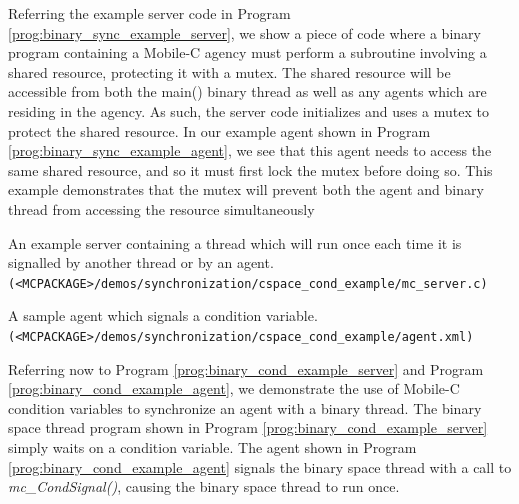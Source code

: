 \documentclass[11pt]{report}
\begin{document}
Referring the example server code in Program
\vref{prog:binary_sync_example_server}, we show a piece of code where
a binary program containing a Mobile-C agency must perform a
subroutine involving a shared resource, protecting it with a mutex. 
The shared resource will
be accessible from both the main() binary thread as well as any agents
which are residing in the agency. As such, the server code 
initializes and uses a mutex to protect the shared resource. In our 
example agent shown in Program \vref{prog:binary_sync_example_agent},
we see that this agent needs to access the same shared resource,
and so it must first lock the mutex before doing so. This example
demonstrates that the mutex will prevent both the agent and binary
thread from accessing the resource simultaneously

\begin{Program}
\begin{center}
   {\footnotesize \linespread{1.0} }
\end{center}
\caption{An example server containing a thread which will run once each time it
is signalled by another thread or by an agent. 
  \texttt{(<MCPACKAGE>/demos/synchronization/cspace\_cond\_example/mc\_server.c)}}
\label{prog:binary_cond_example_server}
\end{Program}

\begin{Program}
\begin{center}
   {\footnotesize \linespread{1.0} }
\end{center}
\caption{A sample agent which signals a condition variable.
\texttt{(<MCPACKAGE>/demos/synchronization/cspace\_cond\_example/agent.xml)}}
\label{prog:binary_cond_example_agent}
\end{Program}

Referring now to 
Program \vref{prog:binary_cond_example_server} and Program 
\vref{prog:binary_cond_example_agent}, we demonstrate the use of 
Mobile-C condition variables to synchronize an agent with a binary thread.
The binary space thread program shown in Program \ref{prog:binary_cond_example_server}
simply waits on a condition variable. The agent shown in Program
\ref{prog:binary_cond_example_agent} signals the binary space thread
with a call to {\it mc\_CondSignal()}, causing the binary space
thread to run once. 
\end{document}
